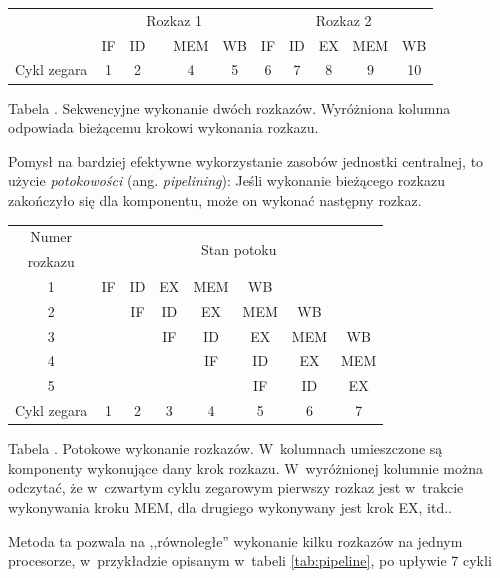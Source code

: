\documentclass[12pt]{mwart}
\newcounter{tabmain}
\newcommand{\mytabcaption}[1]{ \begin{center}Tabela \arabic{tabmain}. #1.\end{center} \addtocounter{tabmain}{1} }
\begin{document}
	\begin{center}
	\centering
	\begin{tabular}{|c|c|c|c|c|c|c|c|c|c|c|} \hline
	& \multicolumn{5}{c|}{Rozkaz 1} & \multicolumn{5}{c|}{Rozkaz 2}  \\
	\hhline{|~|*{10}-}& IF & ID & {\cellcolor{yellow}{EX}} & MEM & WB & IF & ID & EX & MEM & WB\\ \hline \hline
	Cykl zegara & 1 & 2 & {\cellcolor{yellow}{3}} & 4 & 5 & 6 & 7 & 8 & 9 & 10 \\ \hline
	\end{tabular}\par
	\mytabcaption{Sekwencyjne wykonanie dwóch rozkazów. Wyróżniona kolumna odpowiada bieżącemu krokowi wykonania
	rozkazu}
	\end{center}\par
\par
%
\indent 
	Pomysł na bardziej efektywne wykorzystanie zasobów jednostki centralnej, to użycie \emph{potokowości} (ang. \emph{pipelining}):
	Jeśli wykonanie bieżącego rozkazu zakończyło się dla komponentu, może on wykonać następny rozkaz.
	\begin{center}
	\centering
	\begin{tabular}{|c|c|c|c|c|c|c|c|} \hline
	Numer 		 & \multicolumn{7}{c|}{\multirow{2}{*}{Stan potoku}} \\
	rozkazu & \multicolumn{7}{c|}{} \\ \hline
	1 & IF & ID & EX & \cellcolor{yellow} MEM & WB & & \\ \hline
	2 & & IF & ID & \cellcolor{yellow} EX & MEM & WB & \\ \hline
	3 & & & IF & \cellcolor{yellow} ID & EX & MEM & WB \\ \hline
	4 & & & & \cellcolor{yellow} IF & ID & EX & MEM \\ \hline
	5 & & & & \cellcolor{yellow} & IF & ID & EX \\ \hline \hline
	Cykl zegara & 1 & 2 & 3 & \cellcolor{yellow} 4 & 5 & 6 & 7 \\ \hline
	\end{tabular}
	\mytabcaption{Potokowe wykonanie rozkazów. W~kolumnach umieszczone są komponenty wykonujące dany krok rozkazu.
	W~wyróżnionej kolumnie można odczytać, że w~czwartym cyklu zegarowym pierwszy rozkaz jest w~trakcie wykonywania kroku MEM, 
	dla drugiego wykonywany jest krok EX, itd.}
	\label{tab:pipeline}
	\end{center}
	Metoda ta pozwala na ,,równoległe'' wykonanie kilku rozkazów na jednym procesorze, w~przykładzie opisanym w~tabeli \ref{tab:pipeline}, po upływie 7 cykli
\end{document}
